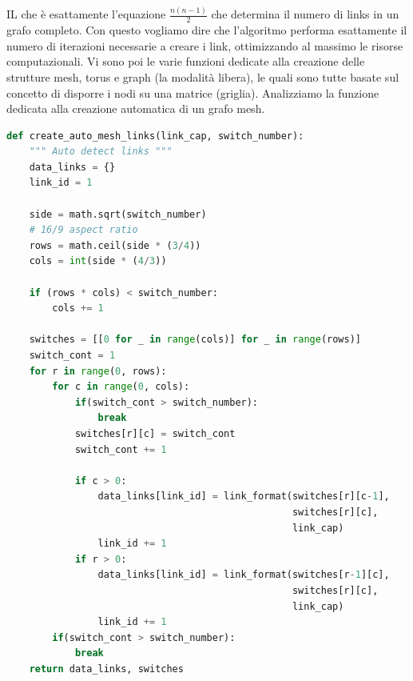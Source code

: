 \documentclass[binding=0.6cm]{sapthesis}
\begin{document}
IL che è esattamente l'equazione \(\frac{n(n-1)}{2}\) che determina il numero di links in un grafo completo. Con questo vogliamo dire che 
l'algoritmo performa esattamente il numero di iterazioni necessarie a creare i link, ottimizzando al massimo le risorse computazionali.
Vi sono poi le varie funzioni dedicate alla creazione delle strutture mesh, torus e graph (la modalità libera), le quali sono tutte basate sul concetto di
disporre i nodi su una matrice (griglia).
Analizziamo la funzione dedicata alla creazione automatica di un grafo mesh.

{\scriptsize %
\begin{lstlisting}[language=Python, basicstyle=\ttfamily, caption={funzione per la creazione automatica di un grafo mesh}, label={codice:create_auto_mesh_links}]
    def create_auto_mesh_links(link_cap, switch_number):
    """ Auto detect links """
    data_links = {}
    link_id = 1

    side = math.sqrt(switch_number)
    # 16/9 aspect ratio
    rows = math.ceil(side * (3/4))
    cols = int(side * (4/3))

    if (rows * cols) < switch_number:
        cols += 1

    switches = [[0 for _ in range(cols)] for _ in range(rows)]
    switch_cont = 1
    for r in range(0, rows):
        for c in range(0, cols):
            if(switch_cont > switch_number):
                break
            switches[r][c] = switch_cont
            switch_cont += 1

            if c > 0:
                data_links[link_id] = link_format(switches[r][c-1], 
                                                  switches[r][c], 
                                                  link_cap)
                link_id += 1
            if r > 0:
                data_links[link_id] = link_format(switches[r-1][c], 
                                                  switches[r][c], 
                                                  link_cap)
                link_id += 1
        if(switch_cont > switch_number):
            break
    return data_links, switches
\end{lstlisting}
} %
\end{document}
